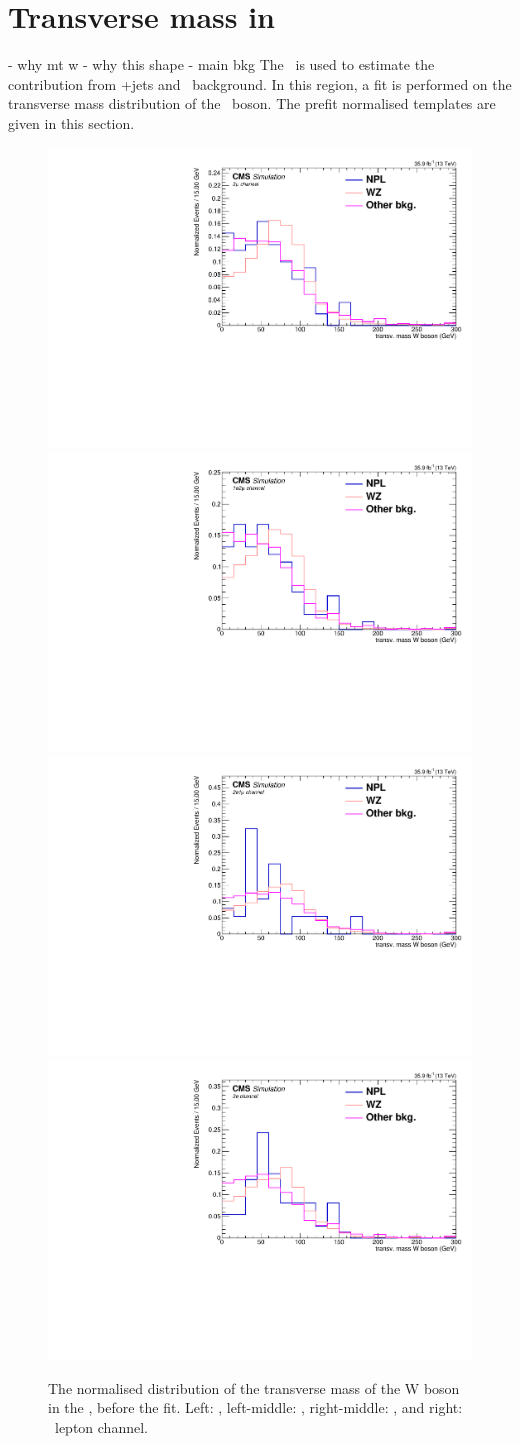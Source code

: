 \section{Transverse mass in \WZCR}
\label{sec:mtw}
- why mt w 
- why this shape
- main bkg
The \WZCR\ is used to estimate the contribution from \WZ+jets and \NPL\ background. In this region, a fit is performed on the transverse mass distribution of the \PW\ boson. The prefit normalised templates are given in this section. 
\begin{figure}[htbp]
	\centering
	\includegraphics[width=0.49\linewidth]{6_Search/Figures/MTWnormalised/MTW_uuu_Normalized}
	\includegraphics[width=0.49\linewidth]{6_Search/Figures/MTWnormalised/MTW_uue_Normalized}
	\includegraphics[width=0.49\linewidth]{6_Search/Figures/MTWnormalised/MTW_eeu_Normalized}
	\includegraphics[width=0.49\linewidth]{6_Search/Figures/MTWnormalised/MTW_eee_Normalized}
	\caption{The normalised distribution of the transverse mass of the W boson in the \WZCR, before the fit. Left: \mumumu, left-middle: \emumu, right-middle: \eemu, and right: \eee\ lepton channel.  }
	\label{fig:mtwnorm}
\end{figure}
